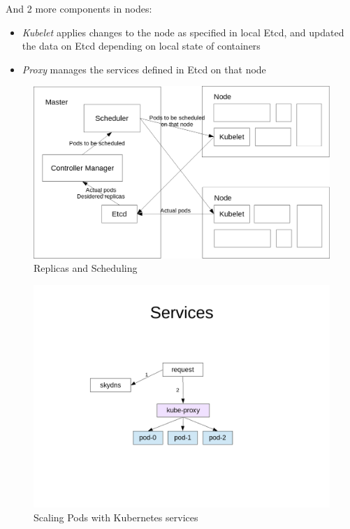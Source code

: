 And 2 more components in nodes:

\begin{itemize}
\item \textit{Kubelet} applies changes to the node as specified in local Etcd, and updated the data on Etcd depending on local state of containers
\item \textit{Proxy} manages the services defined in Etcd on that node
\end{itemize}

\begin{figure}[htbp]
\centering
\includegraphics{media/ch5-scheduling.png}
\caption{Replicas and Scheduling}
\end{figure}

\begin{figure}[htbp]
\centering
\includegraphics{media/ch5-services.png}
\caption{Scaling Pods with Kubernetes services}
\end{figure}

